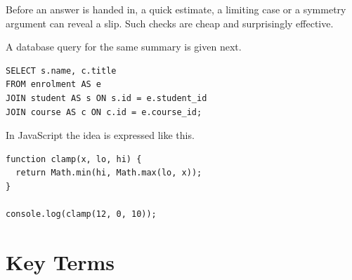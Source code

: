 \documentclass[11pt]{article}
\begin{document}
Before an answer is handed in, a quick estimate, a limiting case or a symmetry argument can reveal a slip. Such checks are cheap and surprisingly effective.

A database query for the same summary is given next.

{\small\begin{verbatim}
SELECT s.name, c.title
FROM enrolment AS e
JOIN student AS s ON s.id = e.student_id
JOIN course AS c ON c.id = e.course_id;
\end{verbatim}}

In JavaScript the idea is expressed like this.

{\small\begin{verbatim}
function clamp(x, lo, hi) {
  return Math.min(hi, Math.max(lo, x));
}

console.log(clamp(12, 0, 10));
\end{verbatim}}

\section{Key Terms}
\end{document}
